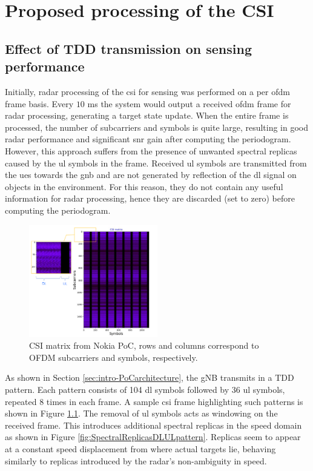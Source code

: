 \chapter{Proposed processing of the CSI}
\label{chap:TDD pattern of the OFDM frame}

\section{Effect of TDD transmission on sensing performance}
\label{sec:frame_sampling_strategies}
	Initially, radar processing  of the \gls{csi} for sensing was performed on a per \gls{ofdm} frame basis. Every $10$ ms the system would output a received \gls{ofdm} frame for radar processing, generating a target state update. When the entire frame is processed, the number of subcarriers and symbols is quite large, resulting in good radar performance and significant \gls{snr} gain after computing the periodogram. However, this approach suffers from the presence of unwanted spectral replicas caused by the \gls{ul} symbols in the frame.
	Received \gls{ul} symbols are transmitted from the \glspl{ue} towards the \gls{gnb} and are not generated by reflection of the \gls{dl} signal on objects in the environment.
	For this reason, they do not contain any useful information for radar processing, hence they are discarded (set to zero) before computing the periodogram.
	
	\begin{figure}[H]
		\centering
		\includegraphics[width=0.5\textwidth]{Images/TDDprocessing/CSIMatrix_DLULpattern.png}
		\caption{CSI matrix from Nokia PoC, rows and columns correspond to OFDM subcarriers and symbols, respectively.}
		\label{fig:CSIMatrix_DLULpattern}
	\end{figure}
	
	As shown in Section \ref{sec:intro-PoCarchitecture}, the gNB transmits in a TDD pattern. Each pattern consists of 104 \gls{dl} symbols followed by 36 \gls{ul} symbols, repeated 8 times in each frame. A sample \gls{csi} frame highlighting such patterns is shown in Figure \ref{fig:CSIMatrix_DLULpattern}.
    The removal of \gls{ul} symbols acts as windowing on the received frame. This introduces additional spectral replicas in the speed domain as shown in Figure \ref{fig:SpectralReplicasDLULpattern}. Replicas seem to appear at a constant speed displacement from where actual targets lie, behaving similarly to replicas introduced by the radar's non-ambiguity in speed.
    
